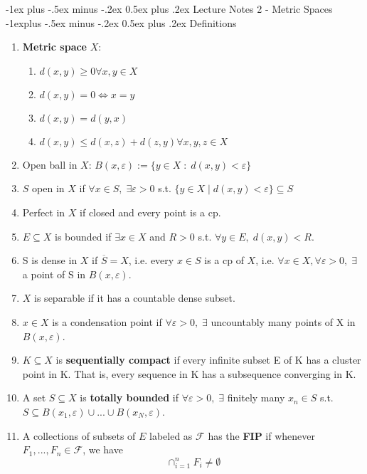 \documentclass[10pt,landscape]{article}
\makeatletter
\renewcommand{\section}{\@startsection{section}{1}{0mm}%
                                {-1ex plus -.5ex minus -.2ex}%
                                {0.5ex plus .2ex}%
                                {\normalfont\large\bfseries}}
\renewcommand{\subsection}{\@startsection{subsection}{2}{0mm}%
                                {-1explus -.5ex minus -.2ex}%
                                {0.5ex plus .2ex}%
                                {\normalfont\normalsize\bfseries}}
\makeatother
\begin{document}
\begin{multicols}{3}
\begin{enumerate}
\end{enumerate}

\section{Lecture Notes 2 - Metric Spaces}
\subsection{Definitions}
\begin{enumerate}
	\item \textbf{Metric space} $X$:
	\begin{enumerate}
		\item $d(x,y) \geq 0 \forall x,y \in X$
		\item $d(x,y) = 0 \iff x=y$
		\item $d(x,y) = d(y,x)$
		\item $d(x,y) \leq d(x,z) + d(z,y) \forall x,y,z \in X$
	\end{enumerate}
	\item Open ball in $X$: $B(x,\varepsilon) := \{ y \in X \; : \; d(x,y) < \varepsilon \} $
	\item $S$ open in $X$ if $\forall x \in S, \; \exists \varepsilon >0 $ s.t. $\{ y\in X \mid d(x,y) <\varepsilon \}\subseteq S$
	\item Perfect in $X$ if closed and every point is a cp.
	\item $E \subseteq X$ is bounded if $\exists x \in X$ and $R> 0$ s.t. $\forall y \in E, \; d(x,y) < R$. 
	\item S is dense in $X$ if $\overline{S} = X$, i.e. every $x\in S$ is a cp of $X$, i.e. $\forall x \in X, \forall \varepsilon>0, \; \exists$ a point of S in $B(x, \varepsilon)$. 
	\item $X$ is separable if it has a countable dense subset.
	\item $x \in X$ is a condensation point if $\forall \varepsilon>0, \; \exists$ uncountably many points of X in $B(x, \varepsilon)$.
	\item $K\subseteq X$ is \textbf{sequentially compact} if every infinite subset E of K has a cluster point in K. That is, every sequence in K has a subsequence converging in K.
	\item A set $S\subseteq X$ is \textbf{totally bounded} if $\forall \varepsilon > 0, \; \exists $ finitely many $x_n \in S$ s.t. $S\subseteq B(x_1, \varepsilon) \cup ... \cup B(x_N, \varepsilon)$. 
	\item A collections of subsets of $E$ labeled as $\mathcal{F}$ has the \textbf{FIP} if whenever $F_1,...,F_n \in \mathcal{F}$, we have
	$$\cap^n_{i=1}F_i \neq \emptyset$$


\end{enumerate}
\end{multicols}
\end{document}
